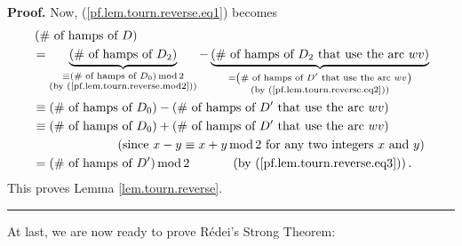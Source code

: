 \documentclass[numbers=enddot,12pt,final,onecolumn,notitlepage]{scrartcl}%
\numberwithin{exer}{subsection}
\theoremstyle{definition}
\newenvironment{proof}[1][Proof]{\noindent\textbf{#1.} }{\ \rule{0.5em}{0.5em}}
\begin{document}
\begin{proof}
Now, (\ref{pf.lem.tourn.reverse.eq1}) becomes
\begin{align*}
&  \left(  \#\text{ of hamps of }D\right) \\
&  =\underbrace{\left(  \#\text{ of hamps of }D_{2}\right)  }%
_{\substack{\equiv\left(  \#\text{ of hamps of }D_{0}\right)
\operatorname{mod}2\\\text{(by (\ref{pf.lem.tourn.reverse.mod2}))}%
}}-\underbrace{\left(  \#\text{ of hamps of }D_{2}\text{ that use the arc
}wv\right)  }_{\substack{=\left(  \#\text{ of hamps of }D^{\prime}\text{ that
use the arc }wv\right)  \\\text{(by (\ref{pf.lem.tourn.reverse.eq2}))}}}\\
&  \equiv\left(  \#\text{ of hamps of }D_{0}\right)  -\left(  \#\text{ of
hamps of }D^{\prime}\text{ that use the arc }wv\right) \\
&  \equiv\left(  \#\text{ of hamps of }D_{0}\right)  +\left(  \#\text{ of
hamps of }D^{\prime}\text{ that use the arc }wv\right) \\
&  \ \ \ \ \ \ \ \ \ \ \ \ \ \ \ \ \ \ \ \ \left(  \text{since }x-y\equiv
x+y\operatorname{mod}2\text{ for any two integers }x\text{ and }y\right) \\
&  =\left(  \#\text{ of hamps of }D^{\prime}\right)  \operatorname{mod}%
2\ \ \ \ \ \ \ \ \ \ \left(  \text{by (\ref{pf.lem.tourn.reverse.eq3}%
)}\right)  .
\end{align*}
This proves Lemma \ref{lem.tourn.reverse}.
\end{proof}

At last, we are now ready to prove R\'{e}dei's Strong Theorem:
\end{document}
